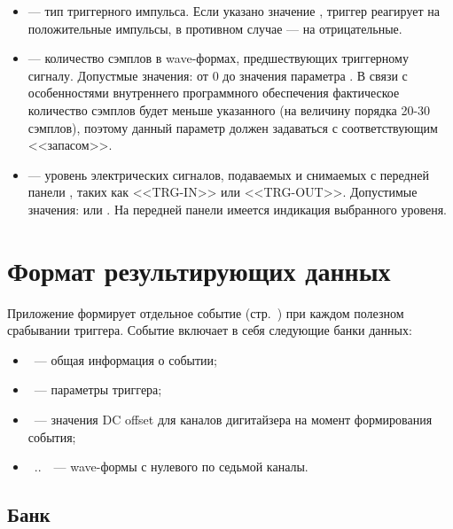 \begin{itemize}
\item {} --- тип триггерного импульса. Если указано значение , триггер реагирует на положительные импульсы, в противном случае --- на отрицательные.

\item 
\label{item-pre-trigger-length}

 --- количество сэмплов в wave-формах, предшествующих триггерному сигналу. Допустмые значения: от 0 до значения параметра . В связи с особенностями внутреннего программного обеспечения \DEVICE{} \cite{CaenUM5961PostTrigger} фактическое количество сэмплов будет меньше указанного (на величину порядка 20-30 сэмплов), поэтому данный параметр должен задаваться с соответствующим <<запасом>>.

\item {} --- уровень электрических сигналов, подаваемых и снимаемых с передней панели \DEVICE{}, таких как <<TRG-IN>> или <<TRG-OUT>>. Допустимые значения:  или . На передней панели \DEVICE{} имеется индикация выбранного уровеня.

\end{itemize}

\section{Формат результирующих данных}
\label{sec_v1720_event}

Приложение \FE{} формирует отдельное событие (стр.~\pageref{sec-midas-event}) при каждом полезном срабывании триггера. Событие включает в себя следующие банки данных:

\begin{itemize}

\item {}~--- общая информация о событии;
\item {}~--- параметры триггера;
\item {}~--- значения DC offset для каналов дигитайзера на момент формирования события;
\item {}~..~~--- wave-формы с нулевого по седьмой каналы.

\end{itemize}

\subsection{Банк }
\label{sec_bank_info}

